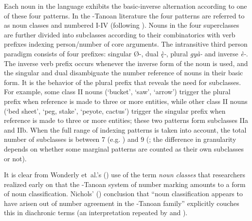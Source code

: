 \documentclass[output=collectionpaper]{langsci/langscibook}
\begin{document}
Each noun in the language exhibits the basic-inverse alternation according to one of these four patterns. In the -Tanoan literature the four patterns are referred to as noun classes and numbered I-IV (following \citealt{Wonderly1954}). Nouns in the four superclasses are further divided into subclasses according to their combinatorics with verb prefixes indexing person/number of core arguments. The intransitive third person paradigm consists of four prefixes: singular Ø-, dual \textit{ę̀-}, plural \textit{gyà-} and inverse \textit{è-}. The inverse verb prefix occurs whenever the inverse form of the noun is used, and the singular and dual disambiguate the number reference of nouns in their basic form. It is the behavior of the plural prefix that reveals the need for subclasses. For example, some class II nouns (`bucket', `saw', `arrow') trigger the plural prefix when reference is made to three or more entities, while other class II nouns (`bed sheet', `peg, stake', `peyote, cactus') trigger the singular prefix when reference is made to three or more entities; these two patterns form subclasses IIa and IIb. When the full range of indexing patterns is taken into account, the total number of subclasses is between 7 (e.g. \citealt{Watkins1984}) and 9 (\citealt{Harbour2008}; the difference in granularity depends on whether some marginal patterns are counted as their own subclasses or not).

It is clear from Wonderly et~al.'s (\citealt*{Wonderly1954}) use of the term \textit{noun classes} that researchers realized early on that the -Tanoan system of number marking amounts to a form of noun classification. Nichols' (\citealt*[141]{Nichols1992}) conclusion that ``noun classification appears to have arisen out of number agreement in the -Tanoan family'' explicitly couches this in diachronic terms (an interpretation repeated by \citealt[377]{Aikhenvald2000} and \citealt[451]{Luraghi2011}).
\end{document}
